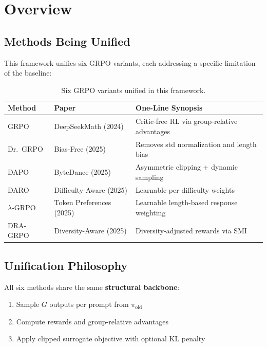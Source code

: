 \documentclass[11pt,a4paper]{article}
\begin{document}
\section{Overview}

\subsection{Methods Being Unified}

This framework unifies six GRPO variants, each addressing a specific limitation of the baseline:

\begin{table}[H]
\centering
\begin{tabular}{@{}lll@{}}
\toprule
\textbf{Method} & \textbf{Paper} & \textbf{One-Line Synopsis} \\
\midrule
GRPO & DeepSeekMath (2024) & Critic-free RL via group-relative advantages \\
Dr.~GRPO & Bias-Free (2025) & Removes std normalization and length bias \\
DAPO & ByteDance (2025) & Asymmetric clipping + dynamic sampling \\
DARO & Difficulty-Aware (2025) & Learnable per-difficulty weights \\
$\lambda$-GRPO & Token Preferences (2025) & Learnable length-based response weighting \\
DRA-GRPO & Diversity-Aware (2025) & Diversity-adjusted rewards via SMI \\
\bottomrule
\end{tabular}
\caption{Six GRPO variants unified in this framework.}
\end{table}

\subsection{Unification Philosophy}

All six methods share the same \textbf{structural backbone}:
\begin{enumerate}
    \item Sample $G$ outputs per prompt from $\pi_{\text{old}}$
    \item Compute rewards and group-relative advantages
    \item Apply clipped surrogate objective with optional KL penalty
\end{enumerate}
\end{document}
